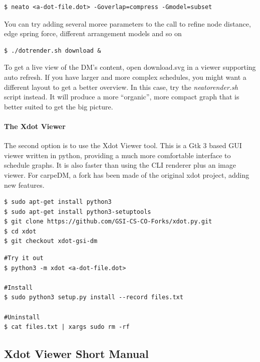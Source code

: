\begin{lstlisting}[style = customshell]
$ neato <a-dot-file.dot> -Goverlap=compress -Gmodel=subset
\end{lstlisting}

You can try adding several moree parameters to the call to refine node distance, edge spring force, different arrangement models and so on
%
\begin{lstlisting}[style = customshell]
$ ./dotrender.sh download &
\end{lstlisting}
%
To get a live view of the DM's content, open download.svg in a viewer supporting auto refresh. If you have larger and more complex schedules, you might want a different layout to get a better overview. In this case, try the \mbox{\emph{neatorender.sh}} script instead. It will produce a more \enquote{organic}, more compact graph that is better suited to get the big picture.

\paragraph{The Xdot Viewer}

The second option is to use the Xdot Viewer tool. This is a Gtk 3 based GUI viewer written in python, providing a much more comfortable interface to schedule graphs. It is also faster than using the CLI renderer plus an image viewer. For carpeDM, a fork has been made of the original xdot project, adding new features.

\begin{lstlisting}[style = customshell]
$ sudo apt-get install python3
$ sudo apt-get install python3-setuptools
$ git clone https://github.com/GSI-CS-CO-Forks/xdot.py.git
$ cd xdot
$ git checkout xdot-gsi-dm
\end{lstlisting}

\begin{lstlisting}[style = customshell]
#Try it out
$ python3 -m xdot <a-dot-file.dot>

#Install
$ sudo python3 setup.py install --record files.txt

#Uninstall
$ cat files.txt | xargs sudo rm -rf
\end{lstlisting}

\subsection{Xdot Viewer Short Manual}


